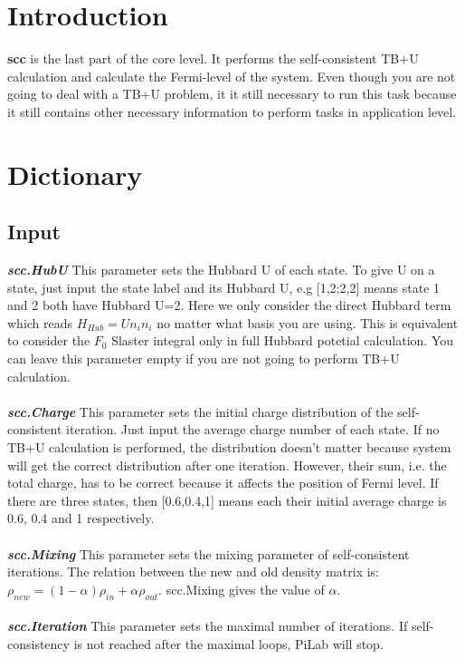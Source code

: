 \documentclass[10pt,a4paper]{article}
\begin{document}
\section{Introduction}
\textbf{scc} is the last part of the core level. It performs the self-consistent TB+U calculation and calculate the Fermi-level of the system. Even though you are not going to deal with a TB+U problem, it it still necessary to run this task because it still contains other necessary information to perform tasks in application level.

\section{Dictionary}

\subsection{Input}
\textit{\textbf{scc.HubU}} This parameter sets the Hubbard U of each state. To give U on a state, just input the state label and its Hubbard U, e.g [1,2;2,2] means state 1 and 2 both have Hubbard U=2. Here we only consider the direct Hubbard term which reads $H_{Hub}=Un_{i}n_{i}$ no matter what basis you are using. This is equivalent to consider the $F_{0}$ Slaster integral only in full Hubbard potetial calculation. You can leave this parameter empty if you are not going to perform TB+U calculation. \\ \\
\textit{\textbf{scc.Charge}} This parameter sets the initial charge distribution of the self-consistent iteration. Just input the average charge number of each state. If no TB+U calculation is performed, the distribution doesn't matter because system will get the correct distribution after one iteration. However, their sum, i.e. the total charge, has to be correct because it affects the position of Fermi level. If there are three states, then [0.6,0.4,1] means each their initial average charge is 0.6, 0.4 and 1 respectively. \\ \\
\textit{\textbf{scc.Mixing}} This parameter sets the mixing parameter of self-consistent iterations. The relation between the new and old density matrix is: $\rho_{new}=(1-\alpha)\rho_{in}+\alpha \rho_{out}$. scc.Mixing gives the value of $\alpha$.\\ \\
\textit{\textbf{scc.Iteration}} This parameter sets the maximal number of iterations. If self-consistency is not reached after the maximal loops, PiLab will stop. \\ \\
\end{document}

